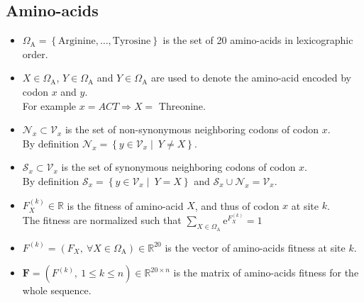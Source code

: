 \documentclass{article}
\newcommand{\e}{\mathrm{e}}
\newcommand{\SetAa}{\Omega_{\mathrm{A}}}
\newcommand{\Neighbor}{\mathcal{V}}
\newcommand{\NonSyn}{\mathcal{N}}
\newcommand{\Syn}{\mathcal{S}}
\newcommand{\Nx}{\Neighbor_x}
\newcommand{\NxNonSyn}{\NonSyn_x}
\newcommand{\NxSyn}{\Syn_x}
\begin{document}
    \subsection{Amino-acids}
    \begin{itemize}
        \item $\SetAa = \left\{ \mathrm{Arginine}, \dots ,\mathrm{Tyrosine} \right\} $ is the set of 20 amino-acids in lexicographic order.
        \item $X \in \SetAa $, $Y \in \SetAa$ and $Y \in \SetAa$ are used to denote the amino-acid encoded by codon $x$ and $y$.
        \\For example $x=ACT \Rightarrow X=$ Threonine.
        \item $\NxNonSyn \subset \Nx $ is the set of non-synonymous neighboring codons of codon $x$.
        \\By definition $\NxNonSyn = \left\{ y \in \Nx  \mid \ Y \neq X  \right\} $.
        \item $\NxSyn \subset \Nx $ is the set of synonymous neighboring codons of codon $x$.
        \\By definition $\NxSyn = \left\{ y \in \Nx \mid \ Y = X  \right\} $ and $\NxSyn \cup \NxNonSyn = \Nx $.
        \item $F_X^{(k)} \in \mathbb{R} $ is the fitness of amino-acid $X$, and thus of codon $x$ at site $k$.\\
        The fitness are normalized such that $\sum_{X \in \SetAa}\e^{F_X^{(k)}} = 1 $
        \item $F^{(k)} = \left( F_X , \ \forall X \in \SetAa \right) \in \mathbb{R}^{20} $ is the vector of amino-acids fitness at site $k$.
        \item $\bm{F} = \left( F^{(k)} , \  1 \leq k \leq n \right) \in \mathbb{R}^{20 \times n} $ is the matrix of amino-acids fitness for the whole sequence.
    \end{itemize}
\end{document}
